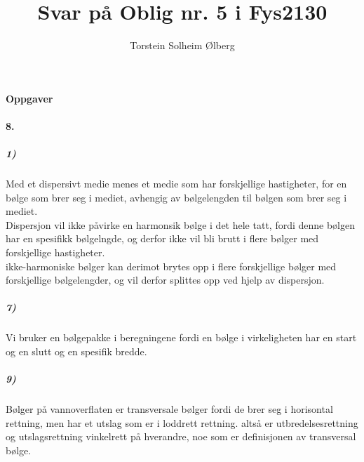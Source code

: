 \documentclass[11pt, A4paper,norsk]{article}
\author{Torstein Solheim Ølberg}
\title{Svar på Oblig nr. 5 i Fys2130}
\begin{document}
\maketitle
	\begin{center}
\Large \textbf{Oppgaver}
	\end{center}









		\paragraph{8.}
			\subparagraph{1)}
				\begin{flushleft}
Med et dispersivt medie menes et medie som har forskjellige hastigheter, for en bølge som brer seg i mediet, avhengig av bølgelengden til bølgen som brer seg i mediet. \\
Dispersjon vil ikke påvirke en harmonsik bølge i det hele tatt, fordi denne bølgen har en spesifikk bølgelngde, og derfor ikke vil bli brutt i flere bølger med forskjellige hastigheter. \\
ikke-harmoniske bølger kan derimot brytes opp i flere forskjellige bølger med forskjellige bølgelengder, og vil derfor splittes opp ved hjelp av dispersjon.
				\end{flushleft}









			\subparagraph{7)}
				\begin{flushleft}
Vi bruker en bølgepakke i beregningene fordi en bølge i virkeligheten har en start og en slutt og en spesifik bredde.
				\end{flushleft}









			\subparagraph{9)}
				\begin{flushleft}
Bølger på vannoverflaten er transversale bølger fordi de brer seg i horisontal rettning, men har et utslag som er i loddrett rettning. altså er utbredelsesrettning og utslagsrettning vinkelrett på hverandre, noe som er definisjonen av transversal bølge.
				\end{flushleft}

			
\end{document}
